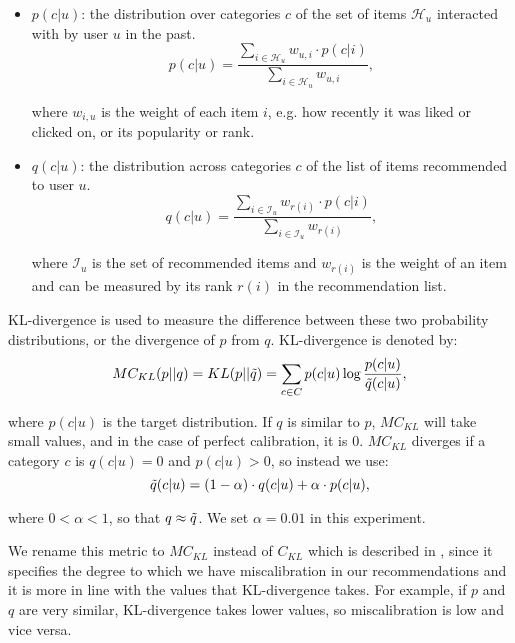     \begin{itemize}
        \item $p(c|u)$: the distribution over categories $c$ of the set of items $\mathcal{H}_u$ interacted with by user $u$ in the past.
        \begin{equation}\label{input_preference}
            p(c|u) = \frac{\sum_{i \in \mathcal{H}_u} w_{u, i} \cdot p(c|i)}{\sum_{i \in \mathcal{H}_u} w_{u, i}},
        \end{equation}
    
        where $w_{i,u}$ is the weight of each item $i$, e.g. how recently it was liked or clicked on, or its popularity or rank.
        
        \item $q(c|u)$: the distribution across categories $c$ of the list of items recommended to user $u$.
        \begin{equation}
            q(c|u) = \frac{\sum_{i \in \mathcal{I}_u} w_{r(i)} \cdot p(c|i)}{\sum_{i \in \mathcal{I}_u} w_{r(i)}},
        \end{equation}
        
        where $\mathcal{I}_u$ is the set of recommended items and $w_{r(i)}$ is the weight of an item and can be measured by its rank $r(i)$ in the recommendation list.
    \end{itemize}
    
    KL-divergence \cite{kullback1997information} is used to measure the difference between these two probability distributions, or the divergence of $p$ from $q$. KL-divergence is denoted by:
    \begin{equation} \label{kl}
    MC_{KL}(p||q) = KL(p||\Tilde{q})= \sum_{c \in C}{p(c|u)\log\frac{p(c|u)}{\Tilde{q}(c|u)}},
    \end{equation}
    
    where $p(c|u)$ is the target distribution. If $q$ is similar to $p$, $MC_{KL}$ will take small values, and in the case of perfect calibration, it is 0. $MC_{KL}$ diverges if a category $c$ is $q(c|u)=0$ and $p(c|u)>0$, so instead we use:
    \begin{equation}
        \Tilde{q}(c|u) = (1 - \alpha) \cdot q(c|u) + \alpha \cdot p(c|u),
    \end{equation}
    
    where $0 < \alpha < 1$, so that $q \approx \Tilde{q}$. We set $\alpha = 0.01$ in this experiment.
    
    We rename this metric to $MC_{KL}$ instead of $C_{KL}$ which is described in \cite{steck2018calibrated}, since it specifies the degree to which we have miscalibration in our recommendations and it is more in line with the values that KL-divergence takes. For example, if $p$ and $q$ are very similar, KL-divergence takes lower values, so miscalibration is low and vice versa.
    
